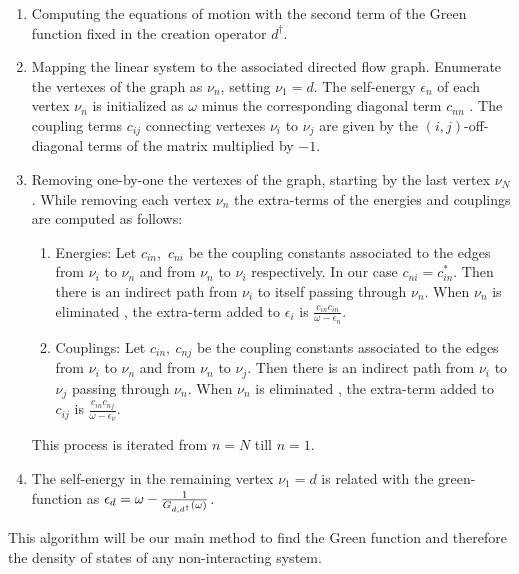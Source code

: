 \begin{enumerate}
    \item Computing the equations of motion with the second term of the Green function fixed in the creation operator $d^\dagger$. 
     \item  Mapping the linear system to the associated directed flow graph. Enumerate the vertexes of the graph as $\nu_n$, setting $\nu_1 = d$. The self-energy $\epsilon_{n}$ of each vertex $\nu_n$ is initialized as $\omega$ minus the corresponding diagonal term $c_{nn}$ .  The coupling terms $c_{ij}$ connecting vertexes $\nu_i$ to $\nu_j$ are given by the $(i,j)$-off-diagonal terms of the matrix multiplied by $-1$.   
    \item Removing one-by-one the vertexes of the graph, starting by the last vertex $\nu_N$. While removing each vertex $\nu_n$ the extra-terms of the energies and couplings are computed as follows:
      \begin{enumerate}
        \item Energies: Let $c_{in}$,\ $c_{ni}$ be the coupling constants associated to the edges from $\nu_i$ to $\nu_n$  and from $\nu_n$ to $\nu_i$ respectively. In our case $c_{ni} = c_{in}^*$. Then there is an indirect path from $\nu_i$ to itself passing through $\nu_n$. When  $\nu_n$ is eliminated , the extra-term added to $\epsilon_{i}$ is   $\frac{c_{in}c_{in}}{\omega-\epsilon_{n}}$. 
        \item Couplings: Let $c_{in},\ c_{nj}$ be the coupling constants associated to the edges from $\nu_i$ to $\nu_n$  and from $\nu_n$ to $\nu_j$. Then there is an indirect path from $\nu_i$ to $\nu_j$ passing through $\nu_n$. When  $\nu_n$ is eliminated , the extra-term added to $c_{ij}$ is   $\frac{c_{in}c_{nj}}{\omega-\epsilon_{\nu}}$. 
        \end{enumerate}
    \ignorespacesafterend  
    This process is iterated from $n=N$ till $n=1$.
    \item The self-energy in the remaining vertex $\nu_1 = d$ is related with the green-function as $\epsilon_d = \omega -\frac{1}{ G_{d,d^\dagger}(\omega)}$.
\end{enumerate}
    
This algorithm will be our main method to find the Green function and therefore the density of states of any non-interacting system.  






